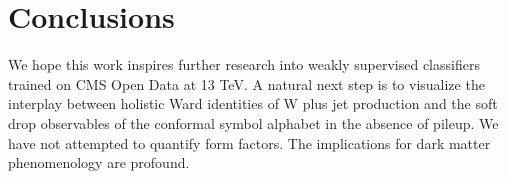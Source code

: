\section{Conclusions}\label{sec:conclusions}

We hope this work inspires further research into weakly supervised
classifiers trained on CMS Open Data at 13 TeV. A natural next step is
to visualize the interplay between holistic Ward identities of W plus
jet production and the soft drop observables of the conformal symbol
alphabet in the absence of pileup. We have not attempted to quantify
form factors. The implications for dark matter phenomenology are
profound.

